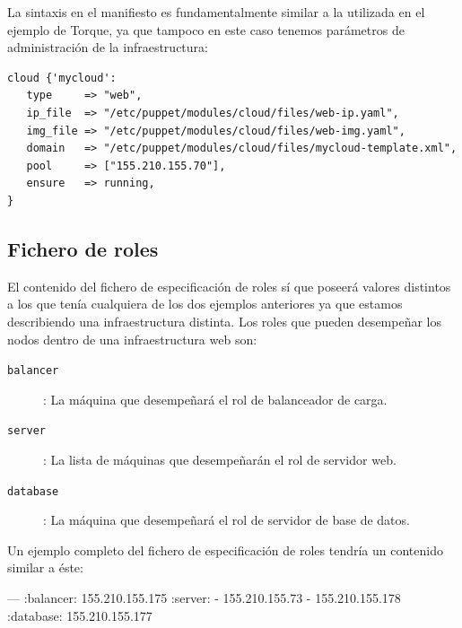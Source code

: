 La sintaxis en el manifiesto es fundamentalmente similar a la utilizada en el ejemplo de Torque, ya que tampoco en este caso tenemos parámetros de administración de la infraestructura:

\begin{lstlisting}
cloud {'mycloud':
   type     => "web",
   ip_file  => "/etc/puppet/modules/cloud/files/web-ip.yaml",
   img_file => "/etc/puppet/modules/cloud/files/web-img.yaml",
   domain   => "/etc/puppet/modules/cloud/files/mycloud-template.xml",
   pool     => ["155.210.155.70"],
   ensure   => running,
}
\end{lstlisting}

\subsection{Fichero de roles}

El contenido del fichero de especificación de roles sí que poseerá valores distintos a los que tenía cualquiera de los dos ejemplos anteriores ya que estamos describiendo una infraestructura distinta. Los roles que pueden desempeñar los nodos dentro de una infraestructura web son:
\begin{description}
\item[\texttt{balancer}]: La máquina que desempeñará el rol de balanceador de carga.
\item[\texttt{server}]: La lista de máquinas que desempeñarán el rol de servidor web.
\item[\texttt{database}]: La máquina que desempeñará el rol de servidor de base de datos.
\end{description}

Un ejemplo completo del fichero de especificación de roles tendría un contenido similar a éste:
\begin{yamlcode}
--- 
:balancer: 155.210.155.175
:server:
- 155.210.155.73
- 155.210.155.178
:database: 155.210.155.177
\end{yamlcode}
